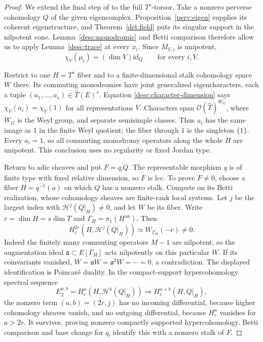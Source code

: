 \begin{proof}
We extend the final step of \cite[Proposition~7.5]{CT} to the full
$T^s$-torsor.  Take a nonzero perverse cohomology $Q$ of the given
eigencomplex.
Proposition~\ref{perv:eigen} supplies its coherent eigenstructure,
and Theorem~\ref{det:field} puts its singular support in the
nilpotent cone.  Lemma~\ref{desc:monodromic} and Betti comparison
therefore allow us to apply Lemma~\ref{desc:trace} at every $x_i$.
Since $M_{V,i}$ is unipotent,
\begin{equation}\label{desc:character-dimension}
                       \chi_V(\mu_i)=(\dim V)\mathrm{id}_Q
                     \qquad\text{for every }i,V.
\end{equation}

Restrict to one $H=T^s$ fiber and to a finite-dimensional stalk
cohomology space $W$ there.  Its commuting monodromies have joint
generalized eigencharacters, each a tuple
$(a_1,\ldots,a_s)\in\widehat T(E)^s$.  Equation
\eqref{desc:character-dimension} says $\chi_V(a_i)=\chi_V(1)$ for
all representations $V$.  Characters span
$\mathcal O(\widehat T)^{W_G}$, where $W_G$ is the Weyl group,
and separate semisimple classes.
Thus $a_i$ has the same image as $1$ in the finite Weyl quotient;
the fiber through $1$ is the singleton $\{1\}$.  Every $a_i=1$,
so all commuting monodromy operators along the whole $H$ are
unipotent.  This conclusion uses no regularity or fixed Jordan type.

Return to adic sheaves and put $F=q_!Q$.  The representable morphism
$q$ is of finite type with fixed relative dimension, so $F$ is lcc.
To prove $F\ne0$, choose a fiber $H=q^{-1}(a)$ on which $Q$ has a
nonzero stalk.  Compute on its Betti realization, whose cohomology
sheaves are finite-rank local systems.
Let $j$ be the largest index with $\mathcal H^j(Q|_H)\ne0$, and
let $W$ be its fiber.  Write $r=\dim H=s\dim T$ and
$\Gamma_H=\pi_1(H^{\mathrm{an}})$.  Then
\[
                  H_c^{2r}(H,\mathcal H^j(Q|_H))
                              \simeq W_{\Gamma_H}(-r)\ne0.
\]
Indeed the finitely many commuting operators $M-1$ are nilpotent,
so the augmentation ideal $\mathfrak a\subset E[\Gamma_H]$ acts
nilpotently on this particular $W$.  If its coinvariants vanished,
$W=\mathfrak aW=\mathfrak a^2W=\cdots=0$, a
contradiction.  The displayed identification is Poincar\'e duality.
In the compact-support hypercohomology spectral sequence
\[
 E_2^{a,b}=H_c^a(H,\mathcal H^b(Q|_H))
                              \Longrightarrow H_c^{a+b}(H,Q|_H),
\]
the nonzero term $(a,b)=(2r,j)$ has no incoming differential, because
higher cohomology sheaves vanish, and no outgoing differential,
because $H_c^a$ vanishes for $a>2r$.  It survives, proving nonzero
compactly supported hypercohomology.  Betti comparison and base
change for $q_!$ identify this with a nonzero stalk of $F$.


\end{proof}

